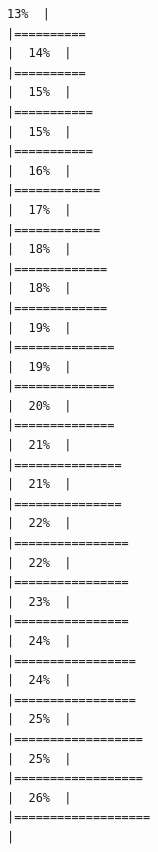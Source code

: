 \documentclass[
  english,
  man,a4paper,mask,floatsintext]{apa6}
\begin{document}
\begin{verbatim}
13%  |                                                                              |==========                                                            |  14%  |                                                                              |==========                                                            |  15%  |                                                                              |===========                                                           |  15%  |                                                                              |===========                                                           |  16%  |                                                                              |============                                                          |  17%  |                                                                              |============                                                          |  18%  |                                                                              |=============                                                         |  18%  |                                                                              |=============                                                         |  19%  |                                                                              |==============                                                        |  19%  |                                                                              |==============                                                        |  20%  |                                                                              |==============                                                        |  21%  |                                                                              |===============                                                       |  21%  |                                                                              |===============                                                       |  22%  |                                                                              |================                                                      |  22%  |                                                                              |================                                                      |  23%  |                                                                              |================                                                      |  24%  |                                                                              |=================                                                     |  24%  |                                                                              |=================                                                     |  25%  |                                                                              |==================                                                    |  25%  |                                                                              |==================                                                    |  26%  |                                                                              |===================                                                   |  
\end{verbatim}
\end{document}
